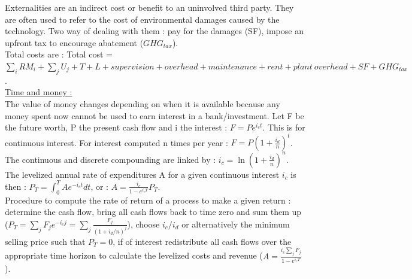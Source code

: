 \documentclass[../main.tex]{subfiles}
\begin{document}
Externalities are an indirect cost or benefit to an uninvolved third party. They are often used to refer to the cost of environmental damages caused by the technology. Two way of dealing with them : pay for the damages (SF), impose an upfront tax to encourage abatement ($GHG_{tax}$). \\
Total costs are : Total cost = $\sum_i RM_i + \sum_j U_j + T + L + supervision+ overhead+maintenance+rent+plant\: overhead+SF+GHG_{tax}$.\\

\quad \underline{Time and money :}\\
The value of money changes depending on when it is available because any money spent now cannot be used to earn interest in a bank/investment. Let F be the future worth, P the present cash flow and i the interest : $F = Pe^{i_ct}$. This is for continuous interest. For interest computed n times per year : $F = P(1+\frac{i_d}{n})^t$.\\
The continuous and discrete compounding are linked by : $i_c = \ln(1+\frac{i_d}{n})^n$.\\
The levelized annual rate of expenditures A for a given continuous interest $i_c$ is then : $P_T = \int_0^T A e^{-i_ct}dt$, or : $A = \frac{i_c}{1-e^{i_cT}} P_T$.\\
Procedure to compute the rate of return of a process to make a given return : determine the cash flow, bring all cash flows back to time zero and sum them up ($P_T = \sum_j F_j e^{-i_cj} = \sum_j \frac{F_j}{(1+i_d/n)^j}$), choose $i_c/i_d$ or alternatively the minimum selling price such that $P_T = 0$, if of interest redistribute all cash flows over the appropriate time horizon to calculate the levelized costs and revenue ($A = \frac{i_c \sum_j F_j}{1-e^{i_cT}}$).
\end{document}
